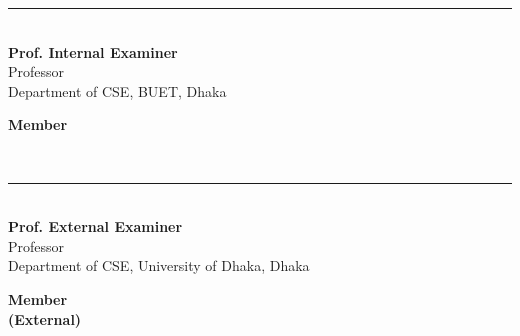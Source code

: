 \begin{titlepage}
\noindent\begin{minipage}[t]{0.5\textwidth}
    \rule{7cm}{0.5pt}\\
    \textbf{Prof. Internal Examiner}\\
    Professor\\
    Department of CSE, BUET, Dhaka
\end{minipage}
\begin{minipage}[t]{0.4\textwidth}
    \hfill \textbf{Member}
\end{minipage}\\[2.5cm]

\noindent\begin{minipage}[t]{0.5\textwidth}
    \rule{7cm}{0.5pt}\\
    \textbf{Prof. External Examiner}\\
    Professor\\
    Department of CSE, University of Dhaka, Dhaka
\end{minipage}
\begin{minipage}[t]{0.4\textwidth}
    \hfill \textbf{Member}\\
    \hfill \textbf{(External)}
\end{minipage}

\end{titlepage}
